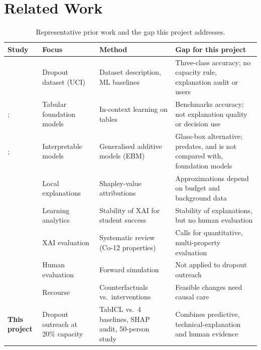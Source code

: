\section{Related Work}
\label{sec:related-work}

\begin{table}[!t]
\centering
\caption{Representative prior work and the gap this project addresses.}
\label{tab:prior-work}
\footnotesize
\setlength{\tabcolsep}{4pt}
\begin{tabular}{@{}>{\raggedright\arraybackslash\leavevmode}p{3.3cm}p{3.6cm}p{4.0cm}p{5.6cm}@{}}
\toprule
\textbf{Study} & \textbf{Focus} & \textbf{Method} & \textbf{Gap for this project} \\
\midrule
\citet{realinho2022predicting} & Dropout dataset (UCI) & Dataset description, ML baselines & Three-class accuracy; no capacity rule, explanation audit or users \\
\citet{qu2025tabicl}; \citet{hollmann2025tabpfn} & Tabular foundation models & In-context learning on tables & Benchmarks accuracy; not explanation quality or decision use \\
\citet{lou2013ebm}; \citet{caruana2015intelligible} & Interpretable models & Generalised additive models (EBM) & Glass-box alternative; predates, and is not compared with, foundation models \\
\citet{lundberg2017shap} & Local explanations & Shapley-value attributions & Approximations depend on budget and background data \\
\citet{tiukhova2024stability} & Learning analytics & Stability of XAI for student success & Stability of explanations, but no human evaluation \\
\citet{nauta2023evaluation} & XAI evaluation & Systematic review (Co-12 properties) & Calls for quantitative, multi-property evaluation \\
\citet{hase2020forward} & Human evaluation & Forward simulation & Not applied to dropout outreach \\
\citet{karimi2021recourse} & Recourse & Counterfactuals vs.\ interventions & Feasible changes need causal care \\
\midrule
\textbf{This project} & Dropout outreach at 20\% capacity & TabICL vs.\ 4 baselines, SHAP audit, 50-person study & Combines predictive, technical-explanation and human evidence \\
\bottomrule
\end{tabular}
\end{table}

